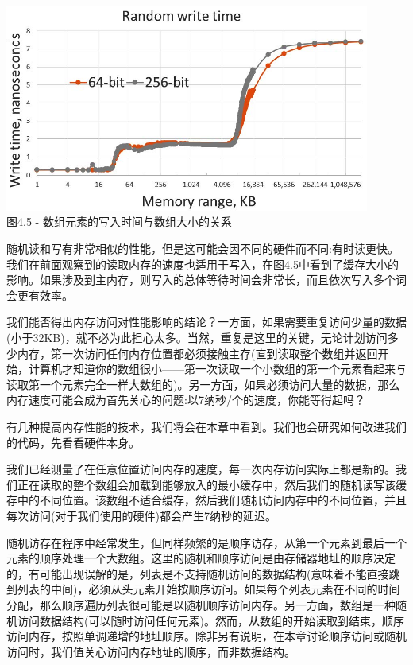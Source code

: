 \begin{center}
\includegraphics[width=0.9\textwidth]{content/1/chapter4/images/5.jpg}\\
图4.5 - 数组元素的写入时间与数组大小的关系
\end{center}

随机读和写有非常相似的性能，但是这可能会因不同的硬件而不同:有时读更快。我们在前面观察到的读取内存的速度也适用于写入，在图4.5中看到了缓存大小的影响。如果涉及到主内存，则写入的总体等待时间会非常长，而且依次写入多个词会更有效率。

我们能否得出内存访问对性能影响的结论？一方面，如果需要重复访问少量的数据(小于32KB)，就不必为此担心太多。当然，重复是这里的关键，无论计划访问多少内存，第一次访问任何内存位置都必须接触主存(直到读取整个数组并返回开始，计算机才知道你的数组很小——第一次读取一个小数组的第一个元素看起来与读取第一个元素完全一样大数组的)。另一方面，如果必须访问大量的数据，那么内存速度可能会成为首先关心的问题:以7纳秒/个的速度，你能等得起吗？

有几种提高内存性能的技术，我们将会在本章中看到。我们也会研究如何改进我们的代码，先看看硬件本身。


我们已经测量了在任意位置访问内存的速度，每一次内存访问实际上都是新的。我们正在读取的整个数组会加载到能够放入的最小缓存中，然后我们的随机读写该缓存中的不同位置。该数组不适合缓存，然后我们随机访问内存中的不同位置，并且每次访问(对于我们使用的硬件)都会产生7纳秒的延迟。

随机访存在程序中经常发生，但同样频繁的是顺序访存，从第一个元素到最后一个元素的顺序处理一个大数组。这里的随机和顺序访问是由存储器地址的顺序决定的，有可能出现误解的是，列表是不支持随机访问的数据结构(意味着不能直接跳到列表的中间)，必须从头元素开始按顺序访问。如果每个列表元素在不同的时间分配，那么顺序遍历列表很可能是以随机顺序访问内存。另一方面，数组是一种随机访问数据结构(可以随时访问任何元素)。然而，从数组的开始读取到结束，顺序访问内存，按照单调递增的地址顺序。除非另有说明，在本章讨论顺序访问或随机访问时，我们值关心访问内存地址的顺序，而非数据结构。

